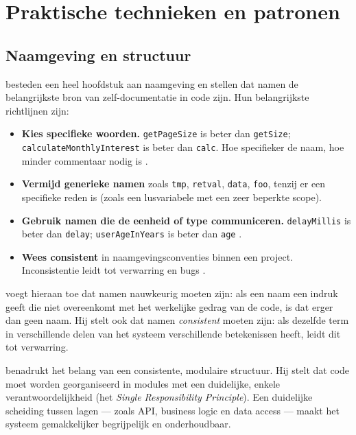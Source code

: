 \section{Praktische technieken en patronen}
\label{sec:cad-technieken}

\subsection{Naamgeving en structuur}
\textcite{boswell2011readablecode} besteden een heel hoofdstuk aan naamgeving en stellen dat namen de belangrijkste bron van zelf-documentatie in code zijn. Hun belangrijkste richtlijnen zijn:

\begin{itemize}
    \item \textbf{Kies specifieke woorden.} \texttt{getPageSize} is beter dan \texttt{getSize}; \texttt{calculateMonthlyInterest} is beter dan \texttt{calc}. Hoe specifieker de naam, hoe minder commentaar nodig is \autocite{boswell2011readablecode}.
    \item \textbf{Vermijd generieke namen} zoals \texttt{tmp}, \texttt{retval}, \texttt{data}, \texttt{foo}, tenzij er een specifieke reden is (zoals een lusvariabele met een zeer beperkte scope).
    \item \textbf{Gebruik namen die de eenheid of type communiceren.} \texttt{delayMillis} is beter dan \texttt{delay}; \texttt{userAgeInYears} is beter dan \texttt{age} \autocite{boswell2011readablecode}.
    \item \textbf{Wees consistent} in naamgevingsconventies binnen een project. Inconsistentie leidt tot verwarring en bugs \autocite{martin2008clean}.
\end{itemize}

\textcite{ousterhout2018philosophy} voegt hieraan toe dat namen nauwkeurig moeten zijn: als een naam een indruk geeft die niet overeenkomt met het werkelijke gedrag van de code, is dat erger dan geen naam. Hij stelt ook dat namen \textit{consistent} moeten zijn: als dezelfde term in verschillende delen van het systeem verschillende betekenissen heeft, leidt dit tot verwarring.

\textcite{martin2008clean} benadrukt het belang van een consistente, modulaire structuur. Hij stelt dat code moet worden georganiseerd in modules met een duidelijke, enkele verantwoordelijkheid (het \textit{Single Responsibility Principle}). Een duidelijke scheiding tussen lagen --- zoals API, business logic en data access --- maakt het systeem gemakkelijker begrijpelijk en onderhoudbaar.

